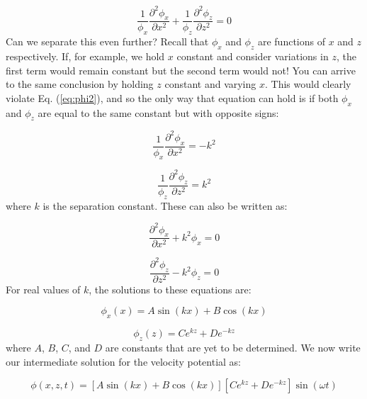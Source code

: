 \documentclass[12pt]{article}
\numberwithin{equation}{section}
\numberwithin{figure}{section}
\numberwithin{table}{section}
\begin{document}
\begin{equation}
  \frac{1}{\phi_x} \frac{\partial^2 \phi_x}{\partial x^2} +
  \frac{1}{\phi_z} \frac{\partial^2 \phi_z}{\partial z^2} = 0
  \label{eq:phi2}
\end{equation}
Can we separate this even further?
Recall that $\phi_x$ and $\phi_z$ are functions of $x$ and $z$ respectively.
If, for example, we hold $x$ constant and consider variations in $z$, the
first term would remain constant but the second term would not!
You can arrive to the same conclusion by holding $z$ constant and varying $x$.
This would clearly violate Eq. (\ref{eq:phi2}), and so the only way that
equation can hold is if both $\phi_x$ and $\phi_z$ are equal to the same
constant but with opposite signs:

\begin{equation}
  \frac{1}{\phi_x} \frac{\partial^2 \phi_x}{\partial x^2} = -k^2
  \label{eq:phi3}
\end{equation}

\begin{equation}
  \frac{1}{\phi_z} \frac{\partial^2 \phi_z}{\partial z^2} = k^2
  \label{eq:phi4}
\end{equation}
where $k$ is the separation constant.
These can also be written as:

\begin{equation}
  \frac{\partial^2 \phi_x}{\partial x^2} + k^2 \phi_x = 0
  \label{eq:phi5}
\end{equation}

\begin{equation}
  \frac{\partial^2 \phi_z}{\partial z^2} - k^2 \phi_z = 0
  \label{eq:phi6}
\end{equation}
For real values of $k$, the solutions to these equations are:

\begin{equation}
  \phi_x(x) = A \sin(kx) + B \cos(kx)
\end{equation}

\begin{equation}
  \phi_z(z) = C e^{kz} + D e^{-kz}
  \label{eq:phi_z}
\end{equation}
where $A$, $B$, $C$, and $D$ are constants that are yet to be determined.
We now write our intermediate solution for the velocity potential as:

\begin{equation}
  \phi(x, z, t) = \left[ A \sin(kx) + B \cos(kx) \right] \left[ C e^{kz} + D e^{-kz} \right] \sin(\omega t)
  \label{eq:phi_inter}
\end{equation}
\end{document}
